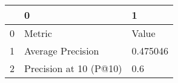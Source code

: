 \begin{tabular}{lll}
\toprule
{} &                       0 &         1 \\
\midrule
0 &                  Metric &     Value \\
1 &       Average Precision &  0.475046 \\
2 &  Precision at 10 (P@10) &       0.6 \\
\bottomrule
\end{tabular}
